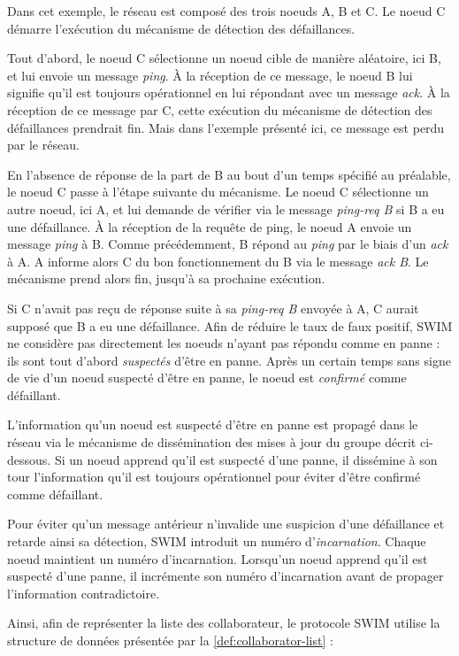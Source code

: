 \documentclass[12pt]{thesul}
\begin{document}
Dans cet exemple, le réseau est composé des trois noeuds A, B et C.
Le noeud C démarre l'exécution du mécanisme de détection des défaillances.

Tout d'abord, le noeud C sélectionne un noeud cible de manière aléatoire, ici B, et lui envoie un message \emph{ping}.
À la réception de ce message, le noeud B lui signifie qu'il est toujours opérationnel en lui répondant avec un message \emph{ack}.
À la réception de ce message par C, cette exécution du mécanisme de détection des défaillances prendrait fin.
Mais dans l'exemple présenté ici, ce message est perdu par le réseau.

En l'absence de réponse de la part de B au bout d'un temps spécifié au préalable, le noeud C passe à l'étape suivante du mécanisme.
Le noeud C sélectionne un autre noeud, ici A, et lui demande de vérifier via le message \emph{ping-req B} si B a eu une défaillance.
À la réception de la requête de ping, le noeud A envoie un message \emph{ping} à B.
Comme précédemment, B répond au \emph{ping} par le biais d'un \emph{ack} à A.
A informe alors C du bon fonctionnement du B via le message \emph{ack B}.
Le mécanisme prend alors fin, jusqu'à sa prochaine exécution.

Si C n'avait pas reçu de réponse suite à sa \emph{ping-req B} envoyée à A, C aurait supposé que B a eu une défaillance.
Afin de réduire le taux de faux positif, SWIM ne considère pas directement les noeuds n'ayant pas répondu comme en panne : ils sont tout d'abord \emph{suspectés} d'être en panne.
Après un certain temps sans signe de vie d'un noeud suspecté d'être en panne, le noeud est \emph{confirmé} comme défaillant.

L'information qu'un noeud est suspecté d'être en panne est propagé dans le réseau via le mécanisme de dissémination des mises à jour du groupe décrit ci-dessous.
Si un noeud apprend qu'il est suspecté d'une panne, il dissémine à son tour l'information qu'il est toujours opérationnel pour éviter d'être confirmé comme défaillant.

Pour éviter qu'un message antérieur n'invalide une suspicion d'une défaillance et retarde ainsi sa détection, SWIM introduit un numéro d'\emph{incarnation}.
Chaque noeud maintient un numéro d'incarnation.
Lorsqu'un noeud apprend qu'il est suspecté d'une panne, il incrémente son numéro d'incarnation avant de propager l'information contradictoire.

Ainsi, afin de représenter la liste des collaborateur, le protocole SWIM utilise la structure de données présentée par la \autoref{def:collaborator-list} :
\end{document}
